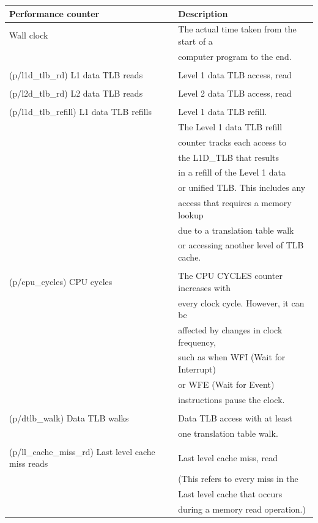 \documentclass[11pt]{article}
\begin{document}
\begin{center}
\begin{tabular}{|l|l|}
\hline
Performance counter & Description \\
\hline
Wall clock & The actual time taken from the start of a \\
 & computer program to the end. \\
 & \\
(p/l1d\_tlb\_rd) L1 data TLB reads & Level 1 data TLB access, read \\
 & \\
(p/l2d\_tlb\_rd) L2 data TLB reads & Level 2 data TLB access, read \\
 & \\
(p/l1d\_tlb\_refill) L1 data TLB refills & Level 1 data TLB refill. \\
 & The Level 1 data TLB refill \\
 & counter tracks each access to \\
 & the L1D\_TLB that results \\
 & in a refill of the Level 1 data \\
 & or unified TLB. This includes any \\
 & access that requires a memory lookup \\
 & due to a translation table walk \\
 & or accessing another level of TLB cache. \\
 & \\
(p/cpu\_cycles) CPU cycles & The CPU CYCLES counter increases with \\
 & every clock cycle. However, it can be \\
 & affected by changes in clock frequency, \\
 & such as when WFI (Wait for Interrupt) \\
 & or WFE (Wait for Event) \\
 & instructions pause the clock. \\
 & \\
(p/dtlb\_walk) Data TLB walks & Data TLB access with at least \\
 & one translation table walk. \\
 & \\
(p/ll\_cache\_miss\_rd) Last level cache miss reads & Last level cache miss, read \\
 & (This refers to every miss in the \\
 & Last level cache that occurs \\
 & during a memory read operation.) \\
\hline
\end{tabular}
\end{center}
\end{document}
